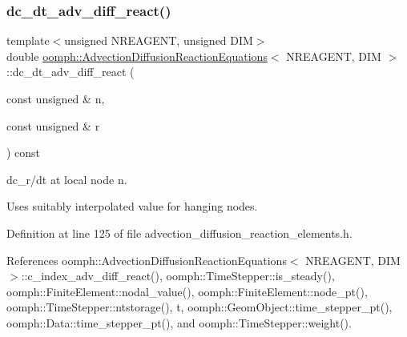 \subsubsection{\texorpdfstring{dc\+\_\+dt\+\_\+adv\+\_\+diff\+\_\+react()}{dc\_dt\_adv\_diff\_react()}\hspace{0.1cm}{\footnotesize\ttfamily [1/2]}}
{\footnotesize\ttfamily template$<$unsigned N\+R\+E\+A\+G\+E\+NT, unsigned D\+IM$>$ \\
double \hyperlink{classoomph_1_1AdvectionDiffusionReactionEquations}{oomph\+::\+Advection\+Diffusion\+Reaction\+Equations}$<$ N\+R\+E\+A\+G\+E\+NT, D\+IM $>$\+::dc\+\_\+dt\+\_\+adv\+\_\+diff\+\_\+react (\begin{DoxyParamCaption}\item[{const unsigned \&}]{n,  }\item[{const unsigned \&}]{r }\end{DoxyParamCaption}) const\hspace{0.3cm}{\ttfamily [inline]}}



dc\+\_\+r/dt at local node n. 

Uses suitably interpolated value for hanging nodes. 

Definition at line 125 of file advection\+\_\+diffusion\+\_\+reaction\+\_\+elements.\+h.



References oomph\+::\+Advection\+Diffusion\+Reaction\+Equations$<$ N\+R\+E\+A\+G\+E\+N\+T, D\+I\+M $>$\+::c\+\_\+index\+\_\+adv\+\_\+diff\+\_\+react(), oomph\+::\+Time\+Stepper\+::is\+\_\+steady(), oomph\+::\+Finite\+Element\+::nodal\+\_\+value(), oomph\+::\+Finite\+Element\+::node\+\_\+pt(), oomph\+::\+Time\+Stepper\+::ntstorage(), t, oomph\+::\+Geom\+Object\+::time\+\_\+stepper\+\_\+pt(), oomph\+::\+Data\+::time\+\_\+stepper\+\_\+pt(), and oomph\+::\+Time\+Stepper\+::weight().

\mbox{\label{classoomph_1_1AdvectionDiffusionReactionEquations_a39154d834bca6581eab17920e8b4e20a}} 
